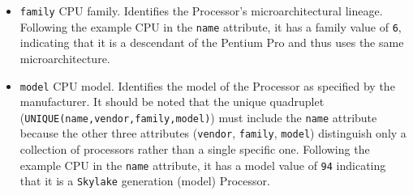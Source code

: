 \begin{itemize}
\begin{itemize}
      \item \texttt{INTEL}
        \newline
        Intel Corporation.

      \item \texttt{UNKNOWN}
        \newline
        Identifies an unknown manufacturer.
    \end{itemize}
    Due to historical reasons, the original manufacturer identifier string value
    read from \texttt{/proc/cpuinfo} is slightly different\footnote{\url{https://wikipedia.org/wiki/CPUID}}:
    \texttt{INTEL} is \texttt{GenuineIntel} and \texttt{AMD} is \texttt{AuthenticAMD}.
    They have been changed/standardized to be more easily identified, with a shorter
    name as well.

  \item \texttt{family}
    \newline
    CPU family.
    \newline
    Identifies the Processor's microarchitectural lineage.
    \newline
    Following the example CPU in the \texttt{name} attribute, it has a family
    value of \texttt{6}, indicating that it is a descendant of the Pentium Pro
    and thus uses the same microarchitecture.

  \item \texttt{model}
    \newline
    CPU model.
    \newline
    Identifies the model of the Processor as specified by the manufacturer.
    \newline
    It should be noted that the unique quadruplet (\texttt{UNIQUE(name,vendor,family,model)})
    must include the \texttt{name} attribute because the other three attributes (\texttt{vendor},
    \texttt{family}, \texttt{model}) distinguish only a collection of processors
    rather than a single specific one.
    \newline
    Following the example CPU in the \texttt{name} attribute, it has a model value
    of \texttt{94} indicating that it is a \texttt{Skylake} generation (model) Processor.


\end{itemize}
